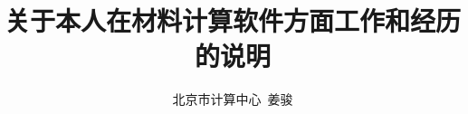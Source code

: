 \documentclass{article}      %
\begin{document}
\graphicspath{{Figures/}}
%
\renewcommand{\abstractname}{\small{\CJKfamily{hei} 摘\quad 要}} %
\renewcommand{\refname}{\centering\CJKfamily{hei} 参考文献}
\renewcommand{\figurename}{{\bf Fig}.}
\renewcommand{\tablename}{{\bf Tab}.}

\makeatletter
\long{}
\makeatother

\newcommand{\keywords}[1]{{\hspace{0\ccwd}\small{\CJKfamily{hei} 关键词:}{\hspace{2ex}{#1}}\bigskip}}



\title{关于本人在材料计算软件方面工作和经历的说明}

\author{
\small
北京市计算中心~姜骏
\small
}
\date{}					%
\maketitle
\end{document}
